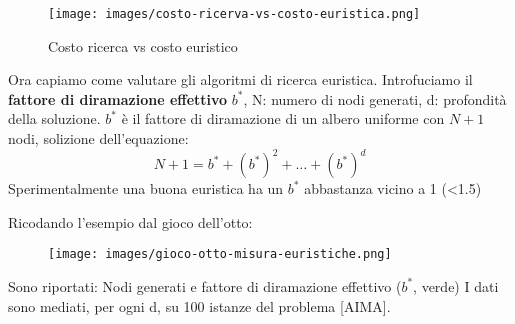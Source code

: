 \begin{figure}[h!]
    \centering
    \texttt{[image: images/costo-ricerva-vs-costo-euristica.png]}
    \caption{Costo ricerca vs costo euristico}
\end{figure}
Ora capiamo come valutare gli algoritmi di ricerca euristica. Introfuciamo
il \textbf{fattore di diramazione effettivo} $b^*$, N: numero di nodi generati, d: profondità della soluzione.
$b^*$ è il fattore di diramazione di un albero uniforme con $N+1$ nodi, solizione dell'equazione:
$$N + 1 = b^* + (b^*)^2 + \dots + (b^*)^d$$
Sperimentalmente una buona euristica ha un $b^*$ abbastanza vicino a 1 (<1.5)
\begin{example}
    Ricodando l'esempio dal gioco dell'otto:
    \begin{figure}[h!]
        \centering
        \texttt{[image: images/gioco-otto-misura-euristiche.png]}
    \end{figure}
    Sono riportati: Nodi generati e fattore di diramazione effettivo ($b^*$, verde)
    I dati sono mediati, per ogni d, su 100 istanze del problema [AIMA].
\end{example}